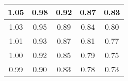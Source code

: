 \begin{large}\begin{tabular}{|c|c|c|c|c|}
\hline
1.05&0.98&0.92&0.87&0.83\\\hline
1.03&0.95&0.89&0.84&0.80\\\hline
1.01&0.93&0.87&0.81&0.77\\\hline
1.00&0.92&0.85&0.79&0.75\\\hline
0.99&0.90&0.83&0.78&0.73\\\hline
\end{tabular}
\end{large}